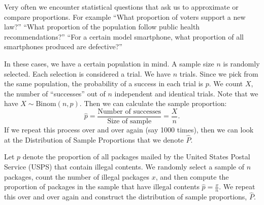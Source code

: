 \pagestyle{fancy}
\renewcommand{\theUnit}{4}
\ifthenelse{\isundefined{\UnitPageNumbers}}{}{\setcounter{page}{1}}
\rhead{Chapter \theUnit: Sampling Distributions}
\rfoot{\mypage}
\renewcommand{\footrulewidth}{.4pt}
\vspace*{-20pt} \thispagestyle{firstfooter}




Very often we encounter statistical questions that ask us to approximate or compare \alert{proportions}. For example
\bi
\ii ``What proportion of voters support a new law?''
\ii ``What proportion of the population follow public health recommendations?''
\ii ``For a certain model smartphone, what proportion of all smartphones produced are defective?''
\ei

\bbox
\bi
\ii In these cases, we have a certain population in mind. A sample size $n$ is randomly selected. 
\bi
\ii[$\circ$] Each selection is considered a trial. We have $n$ trials.
\ii[$\circ$] Since we pick from the same population, the probability of a success in each trial is $p$.
\ii[$\circ$] We count $X$, the number of ``successes'' out of $n$ independent and identical trials.
\ii[$\circ$] Note that we have $X \sim \mbox{Binom}(n,p)$.
\ii[$\circ$] Then we can calculate the sample proportion:
\[ \hat{p} = \frac{\mbox{Number of successes}}{\mbox{Size of sample}} = \frac{X}{n}.\]
\ei
\ii If we repeat this process over and over again (say 1000 times), then we can look at the \alert{Distribution of Sample Proportions} that we denote \alert{$\widehat{P}$}.
\ei
\ebox


\bb
\ii Let $p$ denote the proportion of all packages mailed by the United States Postal Service (USPS) that contain illegal contents. We randomly select a sample of $n$ packages, count the number of illegal packages $x$, and then compute the proportion of packages in the sample that have illegal contents $\hat{p} =\frac{x}{n} $. We repeat this over and over again and construct the distribution of sample proportions, $\widehat{P}$.

